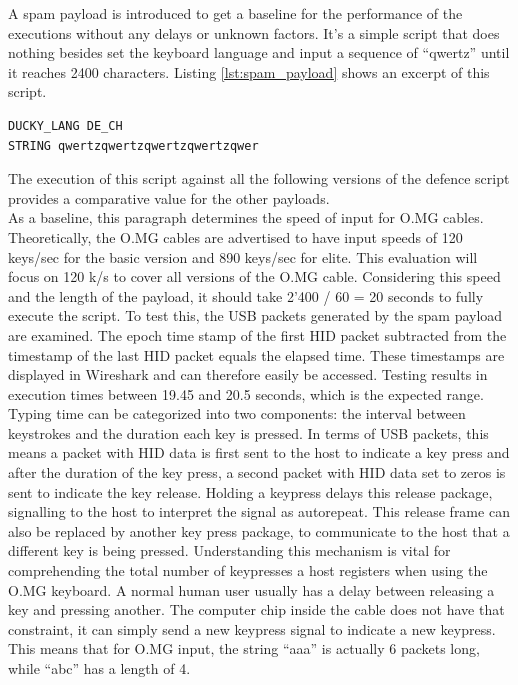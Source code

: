 A spam payload is introduced to get a baseline for the performance of the executions without any delays or unknown factors. It's a simple script that does nothing besides set the keyboard language and input a sequence of ``qwertz'' until it reaches 2400 characters. Listing \ref{lst:spam_payload} shows an excerpt of this script. 


\begin{lstlisting}[caption={Excerpt: write a string of length 2'400 without delays},label=lst:spam_payload, captionpos=b]
DUCKY_LANG DE_CH
STRING qwertzqwertzqwertzqwertzqwer
\end{lstlisting}

The execution of this script against all the following versions of the defence script provides a comparative value for the other payloads. \\
As a baseline, this paragraph determines the speed of input for O.MG cables. Theoretically, the O.MG cables are advertised to have input speeds of 120 keys/sec for the basic version and 890 keys/sec for elite. This evaluation will focus on 120 k/s to cover all versions of the O.MG cable. Considering this speed and the length of the payload, it should take 2'400 / 60 = 20 seconds to fully execute the script. To test this, the USB packets generated by the spam payload are examined. The epoch time stamp of the first HID packet subtracted from the timestamp of the last HID packet equals the elapsed time. These timestamps are displayed in Wireshark and can therefore easily be accessed. Testing results in execution times between 19.45 and 20.5 seconds, which is the expected range. \\
Typing time can be categorized into two components: the interval between keystrokes and the duration each key is pressed. In terms of USB packets, this means a packet with HID data is first sent to the host to indicate a key press and after the duration of the key press, a second packet with HID data set to zeros is sent to indicate the key release. Holding a keypress delays this release package, signalling to the host to interpret the signal as autorepeat. This release frame can also be replaced by another key press package, to communicate to the host that a different key is being pressed. Understanding this mechanism is vital for comprehending the total number of keypresses a host registers when using the O.MG keyboard. A normal human user usually has a delay between releasing a key and pressing another. The computer chip inside the cable does not have that constraint, it can simply send a new keypress signal to indicate a new keypress. This means that for O.MG input, the string ``aaa'' is actually 6 packets long, while ``abc'' has a length of 4. 

